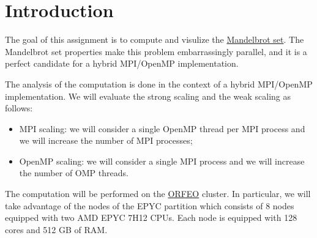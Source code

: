 \section{Introduction}

The goal of this assignment is to compute and visulize the \href{https://en.wikipedia.org/wiki/Mandelbrot_set}{Mandelbrot set}. The Mandelbrot set properties make this problem embarrassingly parallel, and it is a perfect candidate for a hybrid MPI/OpenMP implementation.

The analysis of the computation is done in the context of a hybrid MPI/OpenMP implementation. We will evaluate the strong scaling and the weak scaling as follows:
\begin{itemize}
    \item MPI scaling: we will consider a single OpenMP thread per MPI process and we will increase the number of MPI processes;
    \item OpenMP scaling: we will consider a single MPI process and we will increase the number of OMP threads.
\end{itemize}

The computation will be performed on the \href{https://orfeo-doc.areasciencepark.it/}{ORFEO} cluster. In particular, we will take advantage of the nodes of the EPYC partition which consists of 8 nodes equipped with two AMD EPYC 7H12 CPUs. Each node is equipped with 128 cores and 512 GB of RAM.



